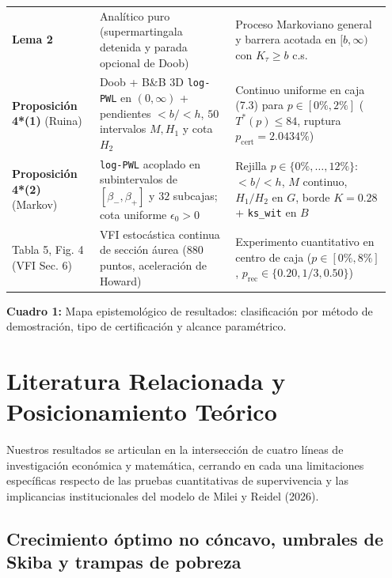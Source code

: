 \documentclass[11pt,letterpaper]{article}
\theoremstyle{plain}
\begin{document}
\begin{table}[htbp]
\begin{tabular}{@{}p{0.22\linewidth}p{0.34\linewidth}p{0.39\linewidth}@{}}
\textbf{Lema 2} & Analítico puro (supermartingala detenida y parada opcional de Doob) & Proceso Markoviano general y barrera acotada en $[b,\infty)$ con $K_\tau\ge b$ c.s. \\
\textbf{Proposición 4*(1)} (Ruina) & Doob + B\&B 3D \texttt{log-PWL} en $(0,\infty)$ + pendientes $<b/<h$, $50$ intervalos $M, H_1$ y cota $H_2$ & Continuo uniforme en caja (7.3) para $p\in[0\%,2\%]$ ($T^*(p)\le 84$, ruptura $p_{\mathrm{cert}}=2.0434\%$) \\
\textbf{Proposición 4*(2)} (Markov) & \texttt{log-PWL} acoplado en subintervalos de $[\beta_-,\beta_+]$ y $32$ subcajas; cota uniforme $\epsilon_0>0$ & Rejilla $p\in\{0\%,\dots,12\%\}$: $<b/<h$, $M$ continuo, $H_1/H_2$ en $G$, borde $K=0.28$ + \texttt{ks\_wit} en $B$ \\
Tabla 5, Fig. 4 (VFI Sec. 6) & VFI estocástica continua de sección áurea ($880$ puntos, aceleración de Howard) & Experimento cuantitativo en centro de caja ($p\in[0\%,8\%]$, $p_{\mathrm{rec}}\in\{0.20,1/3,0.50\}$) \\
\bottomrule
\end{tabular}
\par\vspace{0.45em}
\begin{minipage}{0.95\linewidth}\centering\footnotesize
\textbf{Cuadro 1:} Mapa epistemológico de resultados: clasificación por método de demostración, tipo de certificación y alcance paramétrico.
\end{minipage}
\end{table}

\section{Literatura Relacionada y Posicionamiento Teórico}

Nuestros resultados se articulan en la intersección de cuatro líneas de investigación económica y matemática, cerrando en cada una limitaciones específicas respecto de las pruebas cuantitativas de supervivencia y las implicancias institucionales del modelo de Milei y Reidel (2026).

\subsection{Crecimiento óptimo no cóncavo, umbrales de Skiba y trampas de pobreza}
\end{document}
